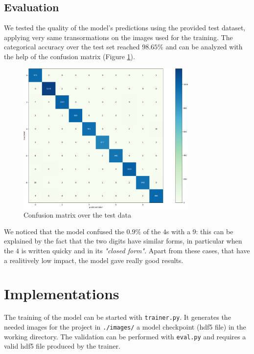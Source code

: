 \documentclass[compsoc]{IEEEtran}
\begin{document}
\subsection{Evaluation}
We tested the quality of the model's predictions using the provided test dataset, applying very same transormations on the images used for the training.
The categorical accuracy 
over the test set reached $98.65\%$ and can be analyzed with the help of the confusion matrix (Figure \ref{fig:cm}). 

\begin{figure}[ht!]
\centering                                                                        
\includegraphics[width=3.5in]{cm2.png}
\captionsetup{justification=centering}                                                                                         
\caption{Confusion matrix over the test data}
\label{fig:cm}                                                                                                                               
\end{figure}

We noticed that the model confused the $0.9\%$ of the $4$s with a $9$: this can be explained by the fact that the two digits have similar forms, in particular when
the $4$ is written quicky and in its \emph{"closed form"}. Apart from these cases, that have a realitively low impact, the model gave really good results.\par

\section{Implementations}
The training of the model can be started with \texttt{trainer.py}. It generates the needed images for the project in \texttt{./images/}
a model checkpoint (hdf5 file) in the working directory. The validation can be performed with \texttt{eval.py} and requires a valid hdf5 file produced by the trainer.\par
\end{document}
